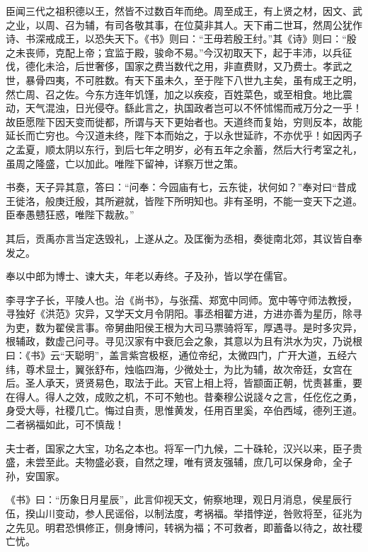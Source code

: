 \documentclass[12pt,UTF8]{ctexbook}
\begin{document}
臣闻三代之祖积德以王，然皆不过数百年而绝。周至成王，有上贤之材，因文、武之业，以周、召为辅，有司各敬其事，在位莫非其人。天下甫二世耳，然周公犹作诗、书深戒成王，以恐失天下。《书》则曰：“王毋若殷王纣。”其《诗》则曰：“殷之未丧师，克配上帝；宜监于殿，骏命不易。”今汉初取天下，起于丰沛，以兵征伐，德化未洽，后世奢侈，国家之费当数代之用，非直费财，又乃费士。孝武之世，暴骨四夷，不可胜数。有天下虽未久，至于陛下八世九主矣，虽有成王之明，然亡周、召之佐。今东方连年饥馑，加之以疾疫，百姓菜色，或至相食。地比震动，天气混浊，日光侵夺。繇此言之，执国政者岂可以不怀怵惕而戒万分之一乎！故臣愿陛下因天变而徙都，所谓与天下更始者也。天道终而复始，穷则反本，故能延长而亡穷也。今汉道未终，陛下本而始之，于以永世延祚，不亦优乎！如因丙子之孟夏，顺太阴以东行，到后七年之明岁，必有五年之余蓄，然后大行考室之礼，虽周之隆盛，亡以加此。唯陛下留神，详察万世之策。



书奏，天子异其意，答曰：“问奉：今园庙有七，云东徙，状何如？”奉对曰“昔成王徙洛，般庚迁殷，其所避就，皆陛下所明知也。非有圣明，不能一变天下之道。臣奉愚戆狂惑，唯陛下裁赦。”



其后，贡禹亦言当定迭毁礼，上遂从之。及匡衡为丞相，奏徙南北郊，其议皆自奉发之。



奉以中郎为博士、谏大夫，年老以寿终。子及孙，皆以学在儒官。



李寻字子长，平陵人也。治《尚书》，与张孺、郑宽中同师。宽中等守师法教授，寻独好《洪范》灾异，又学天文月令阴阳。事丞相翟方进，方进亦善为星历，除寻为吏，数为翟侯言事。帝舅曲阳侯王根为大司马票骑将军，厚遇寻。是时多灾异，根辅政，数虚己问寻。寻见汉家有中衰厄会之象，其意以为且有洪水为灾，乃说根曰：《书》云“天聪明”，盖言紫宫极枢，通位帝纪，太微四门，广开大道，五经六纬，尊术显士，翼张舒布，烛临四海，少微处士，为比为辅，故次帝廷，女宫在后。圣人承天，贤贤易色，取法于此。天官上相上将，皆颛面正朝，忧责甚重，要在得人。得人之效，成败之机，不可不勉也。昔秦穆公说諓々之言，任仡仡之勇，身受大辱，社稷几亡。悔过自责，思惟黄发，任用百里奚，卒伯西域，德列王道。二者祸福如此，可不慎哉！



夫士者，国家之大宝，功名之本也。将军一门九候，二十硃轮，汉兴以来，臣子贵盛，未尝至此。夫物盛必衰，自然之理，唯有贤友强辅，庶几可以保身命，全子孙，安国家。



《书》曰：“历象日月星辰”，此言仰视天文，俯察地理，观日月消息，侯星辰行伍，揆山川变动，参人民谣俗，以制法度，考祸福。举措悖逆，咎败将至，征兆为之先见。明君恐惧修正，侧身博问，转祸为福；不可救者，即蓄备以待之，故社稷亡忧。
\end{document}
